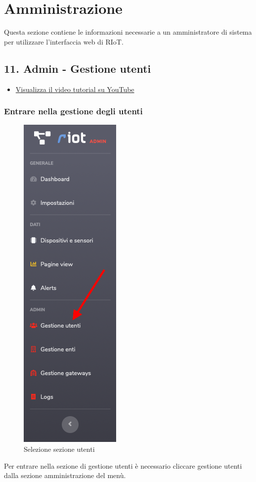 \section{Amministrazione}
Questa sezione contiene le informazioni necessarie a un amministratore di sistema per utilizzare l'interfaccia web di RIoT.

\subsection{11. Admin - Gestione utenti}

	\begin{itemize}
		\item \href{https://www.youtube.com/watch?v=PjySMOLCtMA&list=PLPKYjnuIh1FA3b3jn_bwY_ztYzaFn2mIT&index=14}{Visualizza il video tutorial su YouTube} 
	\end{itemize}

	\subsubsection{Entrare nella gestione degli utenti}		
		\begin{figure}[H]
		\centering
		\includegraphics[scale=0.600]{res/images/admin/menuUtente.png}
		\caption{Selezione sezione utenti}
	\end{figure}
	Per entrare nella sezione di gestione utenti è necessario cliccare gestione utenti dalla sezione amministrazione del menù. 

